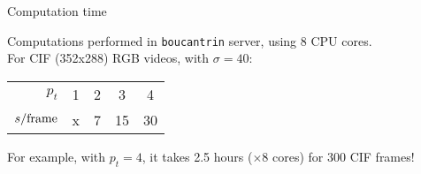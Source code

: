 \documentclass[mathserif, 8pt]{beamer}
\begin{document}
\begin{frame}{Computation time}

	Computations performed in \texttt{boucantrin} server, using 8 CPU cores.\\
	For CIF (352x288) RGB videos, with $\sigma = 40$: 

	\bigskip

	\begin{center}
	\begin{tabular}{r | c c c c}
		$p_t$ & 1 & 2 & 3 & 4 \\
		$s/\textnormal{frame}$ & x & 7 & 15 & 30 \\
	\end{tabular}
	\end{center}

	\vspace{2cm}

	For example, with $p_t = 4$, it takes 2.5 hours ($\times 8$ cores) for 300 CIF frames!

\end{frame}
% 
% 
\end{document}
